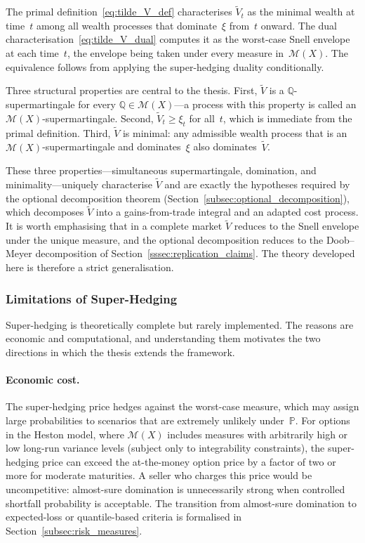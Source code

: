 The primal definition~\eqref{eq:tilde_V_def} characterises
$\tilde{V}_t$ as the minimal wealth at time~$t$ among all wealth
processes that dominate~$\xi$ from~$t$ onward.  The dual
characterisation~\eqref{eq:tilde_V_dual} computes it as the worst-case
Snell envelope at each time~$t$, the envelope being taken under every
measure in~$\mathcal{M}(X)$.  The equivalence follows from applying the
super-hedging duality conditionally.

Three structural properties are central to the thesis.  First,
$\tilde{V}$ is a $\mathbb{Q}$-supermartingale for every
$\mathbb{Q} \in \mathcal{M}(X)$---a process with this property is called
an $\mathcal{M}(X)$-supermartingale.  Second, $\tilde{V}_t \ge \xi_t$
for all~$t$, which is immediate from the primal definition.  Third,
$\tilde{V}$ is minimal: any admissible wealth process that is an
$\mathcal{M}(X)$-supermartingale and dominates~$\xi$ also
dominates~$\tilde{V}$.

These three properties---simultaneous supermartingale, domination, and
minimality---uniquely characterise $\tilde{V}$ and are exactly the
hypotheses required by the optional decomposition theorem
(Section~\ref{subsec:optional_decomposition}), which decomposes
$\tilde{V}$ into a gains-from-trade integral and an adapted cost process.
It is worth emphasising that in a complete market
$\tilde{V}$ reduces to the Snell envelope under the unique measure, and
the optional decomposition reduces to the Doob--Meyer decomposition of
Section~\ref{sssec:replication_claims}.  The theory developed here is
therefore a strict generalisation.


\subsubsection{Limitations of Super-Hedging}
\label{sssec:super_hedging_limitations}

Super-hedging is theoretically complete but rarely implemented.  The
reasons are economic and computational, and understanding them motivates
the two directions in which the thesis extends the framework.

\paragraph{Economic cost.}
The super-hedging price hedges against the worst-case measure, which may
assign large probabilities to scenarios that are extremely unlikely
under~$\mathbb{P}$.  For options in the Heston model, where
$\mathcal{M}(X)$ includes measures with arbitrarily high or low long-run
variance levels (subject only to integrability constraints), the
super-hedging price can exceed the at-the-money option price by a factor
of two or more for moderate maturities.  A seller who charges this price
would be uncompetitive: almost-sure domination is unnecessarily strong
when controlled shortfall probability is acceptable.  The transition from
almost-sure domination to expected-loss or quantile-based criteria is
formalised in Section~\ref{subsec:risk_measures}.

